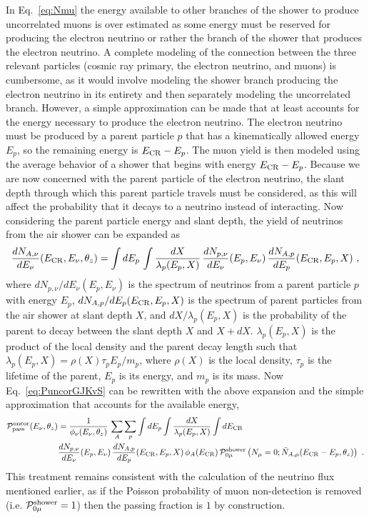 In Eq.~\ref{eq:Nmu} the energy available to other branches of the shower to produce uncorrelated muons is over estimated as some energy must be reserved for producing the electron neutrino or rather the branch of the shower that produces the electron neutrino.
A complete modeling of the connection between the three relevant particles (cosmic ray primary, the electron neutrino, and muons) is cumbersome, as it would involve modeling the shower branch producing the electron neutrino in its entirety and then separately modeling the uncorrelated branch.
However, a simple approximation can be made that at least accounts for the energy necessary to produce the electron neutrino.
The electron neutrino must be produced by a parent particle $p$ that has a kinematically allowed energy $E_p$, so the remaining energy is $E_{\rm CR}-E_p$.
The muon yield is then modeled using the average behavior of a shower that begins with energy $E_{\rm CR}-E_p$.
Because we are now concerned with the parent particle of the electron neutrino, the slant depth through which this parent particle travels must be considered, as this will affect the probability that it decays to a neutrino instead of interacting.
Now considering the parent particle energy and slant depth, the yield of neutrinos from the air shower can be expanded as
\begin{equation}
\label{eq:Anuyield}
\frac{dN_{A, \nu}}{dE_\nu}(E_{\rm CR}, E_\nu, \theta_z) = \int dE_p \, \int \frac{dX}{\lambda_p(E_p, X)} \, \frac{dN_{p, \nu}}{dE_\nu}(E_p, E_\nu) \, \frac{dN_{A, p}}{dE_p}(E_{\rm CR}, E_p, X) ~,
\end{equation}
where $dN_{p, \nu}/dE_\nu(E_p,E_\nu)$ is the spectrum of neutrinos from a parent particle $p$ with energy $E_p$, $dN_{A, p}/dE_p(E_{\rm CR},E_p,X)$ is the spectrum of parent particles from the air shower at slant depth $X$, and $dX/{\lambda_p(E_p, X)}$ is the probability of the parent to decay between the slant depth $X$ and $X+dX$.
$\lambda_p(E_p, X)$ is the product of the local density and the parent decay length such that $\lambda_p(E_p, X)=\rho(X) \tau_p E_p/m_p$, where $\rho(X)$ is the local density, $\tau_p$ is the lifetime of the parent, $E_p$ is its energy, and $m_p$ is its mass.
Now Eq.~\ref{eq:PuncorGJKvS} can be rewritten with the above expansion and the simple approximation that accounts for the available energy,
\begin{align}
\label{eq:PuncorGUE}
{\cal P}_{\rm pass}^{\rm uncor} (E_\nu, \theta_z) & = \frac{1}{\phi_\nu(E_\nu, \theta_z)} \, \sum_A \sum_{p} \int dE_p \int \frac{dX}{\lambda_p(E_p, X)} \int dE_{\rm CR} \nonumber \\
& \frac{dN_{p, \nu}}{dE_\nu}(E_p, E_\nu) \, \frac{dN_{A, p}}{dE_p}(E_{\rm CR}, E_p, X) \, \phi_A(E_{\rm CR}) \, {\cal P}_{0\mu}^{\rm shower} \left(N_\mu = 0  ; \bar N_{A, \mu}(E_{\rm CR} - E_p, \theta_z)\right) ~.
\end{align}
This treatment remains consistent with the calculation of the neutrino flux mentioned earlier, as if the Poisson probability of muon non-detection is removed (i.e. ${\cal P}_{0\mu}^{\rm shower}=1$) then the passing fraction is $1$ by construction.

